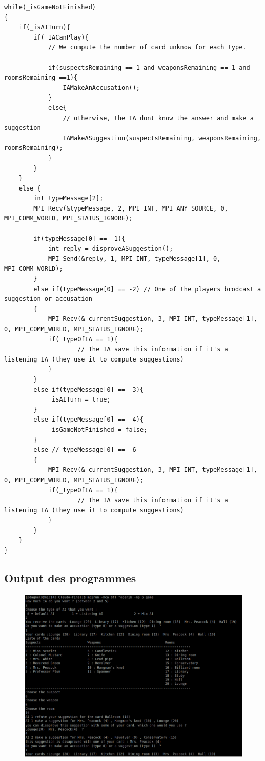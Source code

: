 \documentclass[a4paper,10pt]{article}
\begin{document}
\begin{lstlisting}
while(_isGameNotFinished)
{
	if(_isAITurn){
		if(_IACanPlay){
			// We compute the number of card unknow for each type.
			
			if(suspectsRemaining == 1 and weaponsRemaining == 1 and roomsRemaining ==1){
				IAMakeAnAccusation();
			}
			else{
				// otherwise, the IA dont know the answer and make a suggestion
				IAMakeASuggestion(suspectsRemaining, weaponsRemaining, roomsRemaining);
			}
		}
	}
	else {
		int typeMessage[2];
		MPI_Recv(&typeMessage, 2, MPI_INT, MPI_ANY_SOURCE, 0, MPI_COMM_WORLD, MPI_STATUS_IGNORE);
			
		if(typeMessage[0] == -1){
			int reply = disproveASuggestion();
			MPI_Send(&reply, 1, MPI_INT, typeMessage[1], 0, MPI_COMM_WORLD);
		}
		else if(typeMessage[0] == -2) // One of the players brodcast a suggestion or accusation
		{	
			MPI_Recv(&_currentSuggestion, 3, MPI_INT, typeMessage[1], 0, MPI_COMM_WORLD, MPI_STATUS_IGNORE);
			if(_typeOfIA == 1){
					// The IA save this information if it's a listening IA (they use it to compute suggestions)
			}
		}
		else if(typeMessage[0] == -3){
			_isAITurn = true;
		}
		else if(typeMessage[0] == -4){
			_isGameNotFinished = false;	
		}
		else // typeMessage[0] == -6
		{	
			MPI_Recv(&_currentSuggestion, 3, MPI_INT, typeMessage[1], 0, MPI_COMM_WORLD, MPI_STATUS_IGNORE);
			if(_typeOfIA == 1){
					// The IA save this information if it's a listening IA (they use it to compute suggestions)
			}
		}
	}	
}

\end{lstlisting}
\fontfamily{}
	  

	 \subsection{Output des programmes}
		\begin{figure}[H] \hspace*{-2cm} 
    	\centering
   		  \includegraphics[width=350pt]{output2.png} 
	  	\end{figure}
\end{document}
